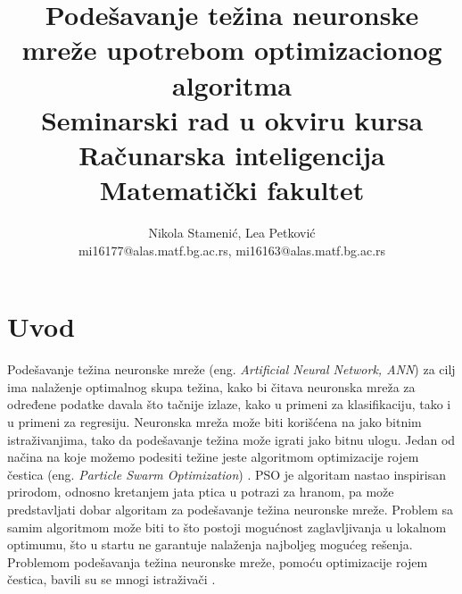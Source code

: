 \documentclass[a4paper]{article}
\begin{document}
\title{Podešavanje težina neuronske mreže upotrebom optimizacionog algoritma\\ \small{Seminarski rad u okviru kursa\\Računarska inteligencija\\ Matematički fakultet}}

\author{Nikola Stamenić, Lea Petković\\ mi16177@alas.matf.bg.ac.rs, mi16163@alas.matf.bg.ac.rs}

\maketitle

\tableofcontents

\newpage

\section{Uvod}
\label{sec:uvod}

Podešavanje težina neuronske mreže (eng. \emph{Artificial Neural Network, ANN}) za cilj ima nalaženje optimalnog skupa težina, kako bi čitava neuronska mreža za određene podatke davala što
tačnije izlaze, kako u primeni za klasifikaciju, tako i u primeni za regresiju. Neuronska mreža može biti korišćena na jako
bitnim istraživanjima, tako da podešavanje težina može igrati jako bitnu ulogu. Jedan od načina na koje možemo podesiti težine jeste algoritmom optimizacije rojem čestica (eng.
\emph{Particle Swarm Optimization}) \cite{PSOANN}. PSO je algoritam nastao inspirisan prirodom, odnosno kretanjem jata ptica u potrazi za hranom, pa može predstavljati dobar algoritam za
podešavanje težina neuronske mreže. Problem sa samim algoritmom može biti to što postoji mogućnost zaglavljivanja u lokalnom optimumu, što u startu ne garantuje nalaženja najboljeg mogućeg
rešenja. Problemom podešavanja težina neuronske mreže, pomoću optimizacije rojem čestica, bavili su se mnogi istraživači \cite{hindawi}.
\end{document}
